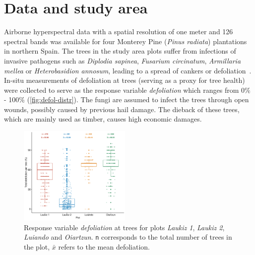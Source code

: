 \documentclass[letterpaper, peerreview]{IEEEtran}
\begin{document}

\section{Data and study area}

\noindent Airborne hyperspectral data with a spatial resolution of one meter and 126 spectral bands was available for four Monterey Pine (\textit{Pinus radiata}) plantations in northern Spain.
The trees in the study area plots suffer from infections of invasive pathogens such as \textit{Diplodia sapinea}, \textit{Fusarium circinatum}, \textit{Armillaria mellea} or \textit{Heterobasidion annosum}, leading to a spread of cankers or defoliation~\cite{mesanza2016, iturritxa2017}.
In-situ measurements of defoliation at trees (serving as a proxy for tree health) were collected to serve as the response variable \textit{defoliation} which ranges from 0\% - 100\% (\autoref{fig:defol-distr}). %
The fungi are assumed to infect the trees through open wounds, possibly caused by previous hail damage\cite{iturritxa2014}.
The dieback of these trees, which are mainly used as timber, causes high economic damages\cite{ganley2009}.

\begin{figure} [t!]
	\centering
	\begin{center}
		\includegraphics[width=0.48\textwidth] {defoliation-distribution-plot-1.pdf}
		\caption{Response variable \textit{defoliation} at trees for plots \textit{Laukiz 1}, \textit{Laukiz 2}, \textit{Luiando} and \textit{Oiartzun}. \texttt{n} corresponds to the total number of trees in the plot, $\bar{x}$ refers to the mean defoliation.}\label{fig:defol-distr}
	\end{center}
\end{figure}
\end{document}
